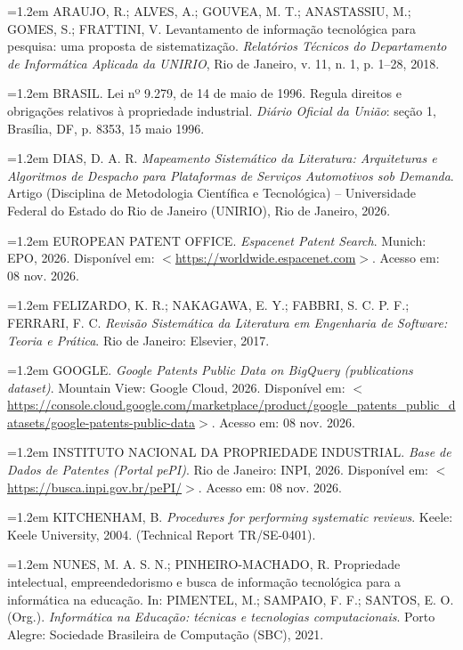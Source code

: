 \documentclass[12pt,a4paper]{article}
\begin{document}
\hangindent=1.2em ARAUJO, R.; ALVES, A.; GOUVEA, M. T.; ANASTASSIU, M.; GOMES, S.; FRATTINI, V. Levantamento de informação tecnológica para pesquisa: uma proposta de sistematização. \textit{Relatórios Técnicos do Departamento de Informática Aplicada da UNIRIO}, Rio de Janeiro, v. 11, n. 1, p. 1--28, 2018.

\hangindent=1.2em BRASIL. Lei nº 9.279, de 14 de maio de 1996. Regula direitos e obrigações relativos à propriedade industrial. \textit{Diário Oficial da União}: seção 1, Brasília, DF, p. 8353, 15 maio 1996.

\hangindent=1.2em DIAS, D. A. R. \textit{Mapeamento Sistemático da Literatura: Arquiteturas e Algoritmos de Despacho para Plataformas de Serviços Automotivos sob Demanda}. Artigo (Disciplina de Metodologia Científica e Tecnológica) -- Universidade Federal do Estado do Rio de Janeiro (UNIRIO), Rio de Janeiro, 2026.

\hangindent=1.2em EUROPEAN PATENT OFFICE. \textit{Espacenet Patent Search}. Munich: EPO, 2026. Disponível em: $<$\url{https://worldwide.espacenet.com}$>$. Acesso em: 08 nov. 2026.

\hangindent=1.2em FELIZARDO, K. R.; NAKAGAWA, E. Y.; FABBRI, S. C. P. F.; FERRARI, F. C. \textit{Revisão Sistemática da Literatura em Engenharia de Software: Teoria e Prática}. Rio de Janeiro: Elsevier, 2017.

\hangindent=1.2em GOOGLE. \textit{Google Patents Public Data on BigQuery (publications dataset)}. Mountain View: Google Cloud, 2026. Disponível em: $<$\url{https://console.cloud.google.com/marketplace/product/google_patents_public_datasets/google-patents-public-data}$>$. Acesso em: 08 nov. 2026.

\hangindent=1.2em INSTITUTO NACIONAL DA PROPRIEDADE INDUSTRIAL. \textit{Base de Dados de Patentes (Portal pePI)}. Rio de Janeiro: INPI, 2026. Disponível em: $<$\url{https://busca.inpi.gov.br/pePI/}$>$. Acesso em: 08 nov. 2026.

\hangindent=1.2em KITCHENHAM, B. \textit{Procedures for performing systematic reviews}. Keele: Keele University, 2004. (Technical Report TR/SE-0401).

\hangindent=1.2em NUNES, M. A. S. N.; PINHEIRO-MACHADO, R. Propriedade intelectual, empreendedorismo e busca de informação tecnológica para a informática na educação. In: PIMENTEL, M.; SAMPAIO, F. F.; SANTOS, E. O. (Org.). \textit{Informática na Educação: técnicas e tecnologias computacionais}. Porto Alegre: Sociedade Brasileira de Computação (SBC), 2021.
\end{document}
